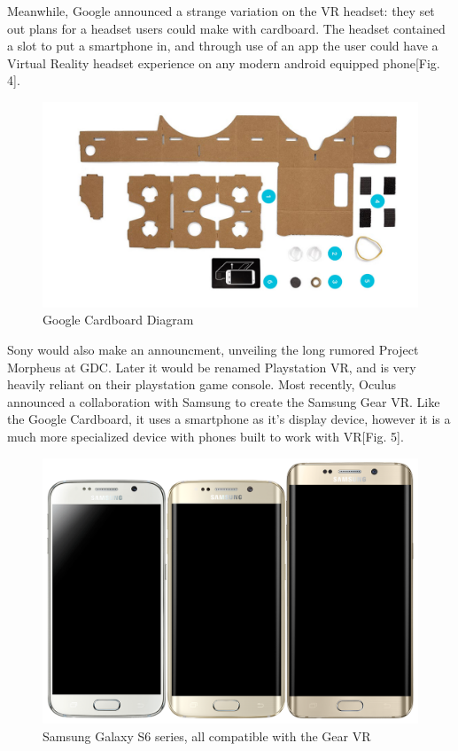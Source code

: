 \documentclass[a4paper,10pt,twoside]{article}
\begin{document}
Meanwhile, Google announced a strange variation on the VR headset:  they set out plans for a headset users could make with cardboard.  The headset contained a slot to put a smartphone in, and through use of an app the user could have a Virtual Reality headset experience on any modern android equipped phone[Fig. 4].
\begin{figure}[H]
	\centerline{\includegraphics[scale=0.4,angle = 90,keepaspectratio]{cardboard.jpg}}
	\caption{Google Cardboard Diagram}
	\label{fig:cardboard}
\end{figure}
Sony would also make an announcment, unveiling the long rumored Project Morpheus at GDC.  Later it would be renamed Playstation VR, and is very heavily reliant on their playstation game console.  Most recently, Oculus announced a collaboration with Samsung to create the Samsung Gear VR.  Like the Google Cardboard, it uses a smartphone as it's display device, however it is a much more specialized device with phones built to work with VR[Fig. 5].

\begin{figure}[H]
	\centerline{\includegraphics[width=\linewidth,height=\paperheight,keepaspectratio]{galaxy5.png}}
	\caption{Samsung Galaxy S6 series, all compatible with the Gear VR}
	\label{fig:samsungGalaxy}
\end{figure}
\end{document}
